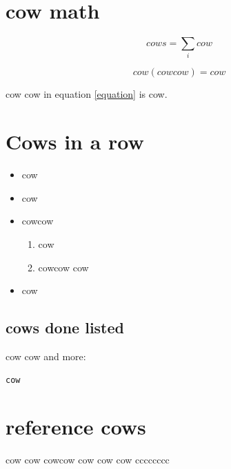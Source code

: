 \documentclass[a4paper,10pt]{article}
\begin{document}
\section{cow math}

\begin{equation}
 cows = \sum\limits_i cow
\end{equation}

\begin{equation}
\label{equation}
cow \left( cowcow  \right) = cow
\end{equation}

cow cow in equation \ref{equation} is cow.

\section{Cows in a row}

\begin{itemize}
 \item cow
 \item cow
 \item cowcow
 \begin{enumerate}
  \item cow 
  \item cowcow cow
 \end{enumerate}
 \item cow

\end{itemize}

\subsection{cows done listed}

cow cow and more:

\begin{verbatim}
cow
\end{verbatim}

\section{reference cows}

\begin{thebibliography}{99}
 cow cow cowcow cow cow cow cccccccc
\end{thebibliography}


 
\end{document}
